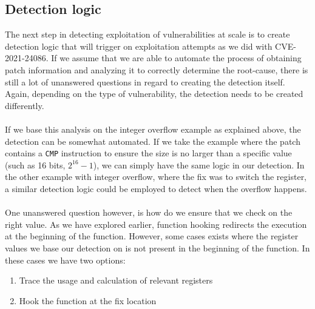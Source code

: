 \documentclass{report}
\begin{document}
\subsection{Detection logic}
The next step in detecting exploitation of vulnerabilities at scale is to create detection logic that will trigger on exploitation attempts as we did with CVE-2021-24086. If we assume that we are able to automate the process of obtaining patch information and analyzing it to correctly determine the root-cause, there is still a lot of unanswered questions in regard to creating the detection itself. Again, depending on the type of vulnerability, the detection needs to be created differently.
\\
\\
If we base this analysis on the integer overflow example as explained above, the detection can be somewhat automated. If we take the example where the patch contains a \texttt{CMP} instruction to ensure the size is no larger than a specific value (such as 16 bits, $2^{16}-1$), we can simply have the same logic in our detection. In the other example with integer overflow, where the fix was to switch the register, a similar detection logic could be employed to detect when the overflow happens.
\\
\\
One unanswered question however, is how do we ensure that we check on the right value. As we have explored earlier, function hooking redirects the execution at the beginning of the function. However, some cases exists where the register values we base our detection on is not present in the beginning of the function. In these cases we have two options:

\begin{enumerate}
    \item Trace the usage and calculation of relevant registers
    \item Hook the function at the fix location
\end{enumerate}
\end{document}
